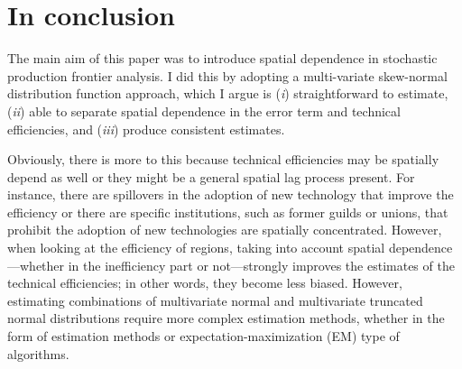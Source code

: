 \documentclass[11pt,parskip,abstracton,notitlepage]{scrartcl}
\begin{document}
\begin{figure}[ht!]
\end{figure}
%
\section{In conclusion}
%
The main aim of this paper was to introduce spatial dependence in stochastic production frontier analysis. I did this by adopting a multi-variate skew-normal distribution function approach, which I argue is (\emph{i}) straightforward to estimate, (\emph{ii}) able to separate spatial dependence in the error term and technical efficiencies, and (\emph{iii}) produce consistent estimates. 

Obviously, there is more to this because technical efficiencies may be spatially depend as well or they might be a general spatial lag process present. For instance, there are spillovers in the adoption of new technology that improve the efficiency or there are specific institutions, such as former guilds or unions, that prohibit the adoption of new technologies are spatially concentrated. However, when looking at the efficiency of regions, taking into account spatial dependence---whether in the inefficiency part or not---strongly improves the estimates of the technical efficiencies; in other words, they become less biased. However, estimating combinations of multivariate normal and multivariate truncated normal distributions require more complex estimation methods, whether in the form of estimation methods or expectation-maximization (EM) type of algorithms.
\end{document}
